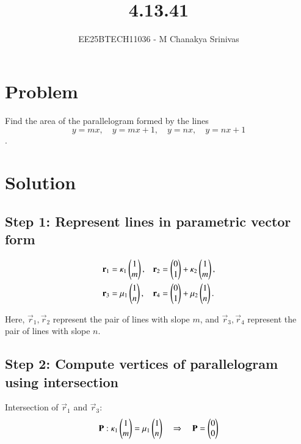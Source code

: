 \documentclass[journal]{IEEEtran}
\begin{document}

\vspace{3cm}

\title{4.13.41}
\author{EE25BTECH11036 - M Chanakya Srinivas}
\maketitle

\renewcommand{\thetable}{\theenumi}
\setlength{\intextsep}{10pt}
\renewcommand\theequation{\arabic{equation}}


\section*{Problem}
Find the area of the parallelogram formed by the lines
\[
y = m x, \quad y = m x + 1, \quad y = n x, \quad y = n x + 1
\]
.

\section*{Solution }

\subsection*{Step 1: Represent lines in parametric vector form}

\begin{align}
\mathbf{r}_1 &= \kappa_1 \begin{pmatrix}1\\m\end{pmatrix}, & 
\mathbf{r}_2 &= \begin{pmatrix}0\\1\end{pmatrix} + \kappa_2 \begin{pmatrix}1\\m\end{pmatrix}, \\
\mathbf{r}_3 &= \mu_1 \begin{pmatrix}1\\n\end{pmatrix}, & 
\mathbf{r}_4 &= \begin{pmatrix}0\\1\end{pmatrix} + \mu_2 \begin{pmatrix}1\\n\end{pmatrix}.
\end{align}

Here, \(\vec{r}_1, \vec{r}_2\) represent the pair of lines with slope \(m\), and
\(\vec{r}_3, \vec{r}_4\) represent the pair of lines with slope \(n\).

\subsection*{Step 2: Compute vertices of parallelogram using intersection}

Intersection of \(\vec{r}_1\) and \(\vec{r}_3\):
\[
\mathbf{P} : \kappa_1 \begin{pmatrix}1\\m\end{pmatrix} = \mu_1 \begin{pmatrix}1\\n\end{pmatrix} \quad \Rightarrow \quad \mathbf{P} = \begin{pmatrix}0\\0\end{pmatrix}
\]
\end{document}
